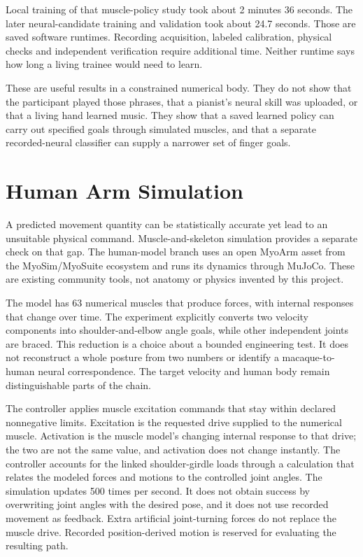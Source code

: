 Local training of that muscle-policy study took about 2 minutes 36 seconds.
The later neural-candidate training and validation took about 24.7 seconds.
Those are saved software runtimes. Recording acquisition, labeled calibration,
physical checks and independent verification require additional time. Neither
runtime says how long a living trainee would need to learn.

These are useful results in a constrained numerical body. They do not show that
the participant played those phrases, that a pianist's neural skill was uploaded,
or that a living hand learned music. They show that a saved learned policy can
carry out specified goals through simulated muscles, and that a separate
recorded-neural classifier can supply a narrower set of finger goals.



\section{Human Arm Simulation}

A predicted movement quantity can be statistically accurate yet lead to an unsuitable physical command. Muscle-and-skeleton simulation provides a separate check on that gap. The human-model branch uses an open MyoArm asset from the MyoSim/MyoSuite ecosystem and runs its dynamics through MuJoCo. These are existing community tools, not anatomy or physics invented by this project.\cite{myosim2026,myosuite2022,mujoco2012}

The model has 63 numerical muscles that produce forces, with internal responses that change over time. The experiment explicitly converts two velocity components into shoulder-and-elbow angle goals, while other independent joints are braced. This reduction is a choice about a bounded engineering test. It does not reconstruct a whole posture from two numbers or identify a macaque-to-human neural correspondence. The target velocity and human body remain distinguishable parts of the chain.

The controller applies muscle excitation commands that stay within declared nonnegative limits. Excitation is the requested drive supplied to the numerical muscle. Activation is the muscle model's changing internal response to that drive; the two are not the same value, and activation does not change instantly. The controller accounts for the linked shoulder-girdle loads through a calculation that relates the modeled forces and motions to the controlled joint angles. The simulation updates 500 times per second. It does not obtain success by overwriting joint angles with the desired pose, and it does not use recorded movement as feedback. Extra artificial joint-turning forces do not replace the muscle drive. Recorded position-derived motion is reserved for evaluating the resulting path.

